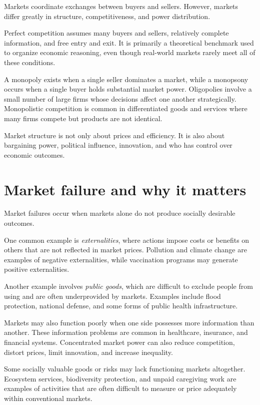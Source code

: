 \documentclass[
  11pt,
  oneside]{book}
\begin{document}
Markets coordinate exchanges between buyers and sellers. However, markets differ greatly in structure, competitiveness, and power distribution.

Perfect competition assumes many buyers and sellers, relatively complete information, and free entry and exit. It is primarily a theoretical benchmark used to organize economic reasoning, even though real-world markets rarely meet all of these conditions.

A monopoly exists when a single seller dominates a market, while a monopsony occurs when a single buyer holds substantial market power. Oligopolies involve a small number of large firms whose decisions affect one another strategically. Monopolistic competition is common in differentiated goods and services where many firms compete but products are not identical.

Market structure is not only about prices and efficiency. It is also about bargaining power, political influence, innovation, and who has control over economic outcomes.

\section{Market failure and why it matters}\label{market-failure-and-why-it-matters}

Market failures occur when markets alone do not produce socially desirable outcomes.

One common example is \emph{externalities}, where actions impose costs or benefits on others that are not reflected in market prices. Pollution and climate change are examples of negative externalities, while vaccination programs may generate positive externalities.

Another example involves \emph{public goods}, which are difficult to exclude people from using and are often underprovided by markets. Examples include flood protection, national defense, and some forms of public health infrastructure.

Markets may also function poorly when one side possesses more information than another. These information problems are common in healthcare, insurance, and financial systems. Concentrated market power can also reduce competition, distort prices, limit innovation, and increase inequality.

Some socially valuable goods or risks may lack functioning markets altogether. Ecosystem services, biodiversity protection, and unpaid caregiving work are examples of activities that are often difficult to measure or price adequately within conventional markets.
\end{document}
